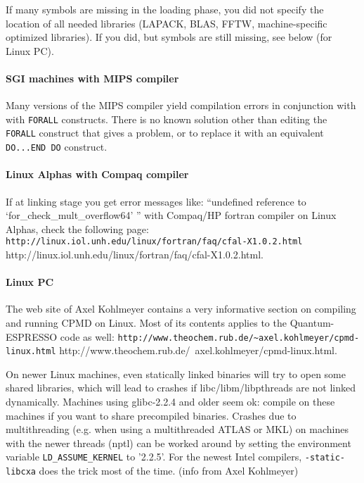 \documentclass[12pt,a4paper]{article}
\begin{document}
If many symbols are missing in the loading phase, you did not specify
the location of all needed libraries (LAPACK, BLAS, FFTW,
machine-specific optimized libraries).  If you did, but symbols are
still missing, see below (for Linux PC).

\paragraph{SGI machines with MIPS compiler}

Many versions of the MIPS compiler yield compilation errors in
conjunction with with \texttt{FORALL} constructs. There is no
known solution other than editing the \texttt{FORALL} construct
that gives a problem, or to replace it with an equivalent 
\texttt{DO...END DO} construct.

\paragraph{Linux Alphas with Compaq compiler}

If at linking stage you get error messages like: ``undefined reference
to `for\_check\_mult\_overflow64' '' with Compaq/HP fortran compiler
on Linux Alphas, check the following page:
\htmladdnormallink%
{\texttt{http://linux.iol.unh.edu/linux/fortran/faq/cfal-X1.0.2.html}}%
{http://linux.iol.unh.edu/linux/fortran/faq/cfal-X1.0.2.html}.

\paragraph{Linux PC}

The web site of Axel Kohlmeyer contains a very informative section 
on compiling and running CPMD on Linux.
Most of its contents applies to the Quantum-ESPRESSO code as well:\hfill\break
\htmladdnormallink%
{\texttt{http://www.theochem.rub.de/\~{}axel.kohlmeyer/cpmd-linux.html}}%
{http://www.theochem.rub.de/~axel.kohlmeyer/cpmd-linux.html}.

On newer Linux machines, even statically linked binaries will try 
to open some shared libraries, which will lead to crashes
if libc/libm/libpthreads are not linked dynamically. Machines 
using glibc-2.2.4 and older seem ok: compile on these machines
if you want to share precompiled binaries. Crashes due to multithreading 
(e.g. when using a multithreaded ATLAS or MKL) on machines with 
the newer threads (nptl) can be worked around by setting the 
environment variable \texttt{LD\_ASSUME\_KERNEL} to '2.2.5'. For 
the newest Intel compilers, \texttt{-static-libcxa} does the 
trick most of the time. (info from Axel Kohlmeyer)
\end{document}
